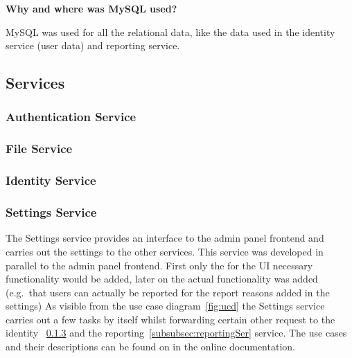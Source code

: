 \textbf{Why and where was MySQL used?}

MySQL was used for all the relational data, like the data used in the identity service (user data) and reporting service. 
\subsection{Services}

\subsubsection{Authentication Service}

\subsubsection{File Service}

\subsubsection{Identity Service}
\label{subsubsec:identitySer}

\subsubsection{Settings Service}
\label{subsubsec:settingsSer}
The Settings service provides an interface to the admin panel frontend and carries out the settings to the other services.
This service was developed in parallel to the admin panel frontend. %
First only the for the UI necessary functionality would be added, later on the actual functionality was added (e.g.\ that users can actually be reported for the report reasons added in the settings)
As visible from the use case diagram~\ref{fig:ucd} the Settings service carries out a few tasks by itself whilst forwarding
certain other request to the identity ~\ref{subsubsec:identitySer} and the reporting~\ref{subsubsec:reportingSer} service.
The use cases and their descriptions can be found on in the online documentation.

